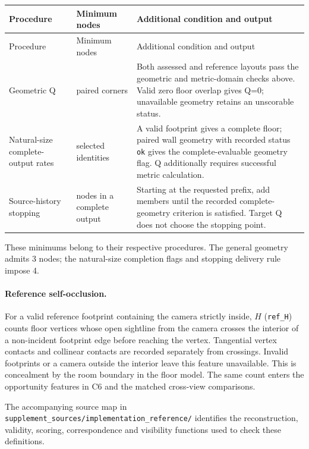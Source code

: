 \begingroup\small
\begin{longtable}{@{}>{\raggedright\arraybackslash}p{.24\linewidth}>{\raggedright\arraybackslash}p{.14\linewidth}>{\raggedright\arraybackslash}p{.56\linewidth}@{}}
\toprule
Procedure & Minimum nodes & Additional condition and output\\
\midrule\endfirsthead
\toprule Procedure & Minimum nodes & Additional condition and output\\\midrule\endhead
Geometric Q & 3 paired corners & Both assessed and reference layouts pass the geometric and metric-domain checks above. Valid zero floor overlap gives Q=0; unavailable geometry retains an unscorable status.\\[3pt]
Natural-size complete-output rates & 4 selected identities & A valid footprint gives a complete floor; paired wall geometry with recorded status \texttt{ok} gives the complete-evaluable geometry flag. Q additionally requires successful metric calculation.\\[3pt]
Source-history stopping & 4 nodes in a complete output & Starting at the requested prefix, add members until the recorded complete-geometry criterion is satisfied. Target Q does not choose the stopping point.\\
\bottomrule
\end{longtable}
\endgroup

These minimums belong to their respective procedures. The general geometry
admits 3 nodes; the natural-size completion
flags and stopping delivery rule impose 4.

\paragraph{Reference self-occlusion.}
For a valid reference footprint containing the camera strictly inside,
$H$ (\texttt{ref\_H}) counts floor vertices whose open sightline from the
camera crosses the interior of a non-incident footprint edge before reaching
the vertex. Tangential vertex contacts and collinear contacts are recorded
separately from crossings. Invalid footprints or a camera outside the
interior leave this feature unavailable. This is concealment by the room
boundary in the floor model. The same count enters the opportunity features
in C6 and the matched cross-view comparisons.

The accompanying source map in
\texttt{supplement\_sources/implementation\_reference/} identifies the
reconstruction, validity, scoring, correspondence and visibility functions
used to check these definitions.
